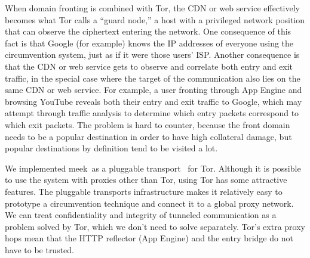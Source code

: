 \documentclass[conference]{IEEEtran}
\def\meek{meek}
\begin{document}
When domain fronting is combined with Tor,
the CDN or web service effectively becomes
what Tor calls a ``guard node,''
a host with a privileged network position that can observe
the ciphertext entering the network.
One consequence of this fact is that Google (for example)
knows the IP addresses of everyone using the circumvention system,
just as if it were those users' ISP.
Another consequence is that the CDN or web service gets
to observe and correlate both entry and exit traffic,
in the special case where the target of the communication
also lies on the same CDN or web service.
For example, a user fronting through App Engine and
browsing YouTube reveals both their entry and exit traffic to Google,
which may attempt through traffic analysis to determine
which entry packets correspond to which exit packets.
The problem is hard to counter, because the front domain needs
to be a popular destination in order to have high collateral damage,
but popular destinations by definition tend to be visited a lot.

We implemented \meek\ as a pluggable transport~\cite{pt} for Tor.
Although it is possible to use the system with proxies other than Tor,
using Tor has some attractive features.
The pluggable transports infrastructure makes it relatively easy to prototype
a circumvention technique and connect it to a global proxy network.
We can treat confidentiality and integrity of tunneled communication
as a problem solved by Tor, which we don't need to solve separately.
Tor's extra proxy hops mean that the HTTP reflector (App Engine)
and the entry bridge do not have to be trusted.




\end{document}
